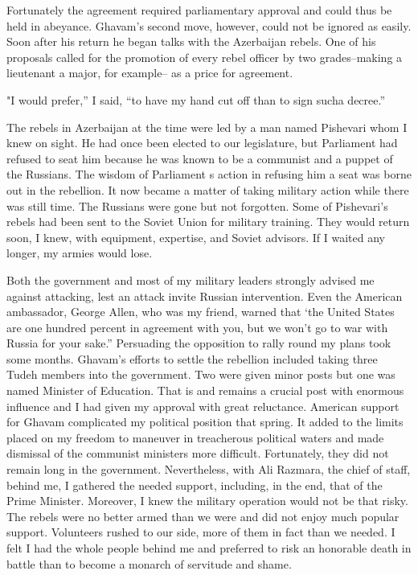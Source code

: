 Fortunately the agreement required parliamentary approval and could thus be held in abeyance. Ghavam's second move, however, could not be ignored as easily. Soon after his return he began talks with the Azerbaijan rebels. One of his proposals called for the promotion of every rebel officer by two grades--making a lieutenant a major, for example-- as a price for agreement. 

"I would prefer,” I said, “to have my hand cut off than to sign sucha 
decree.” 

The rebels in Azerbaijan at the time were led by a man named Pishevari whom I knew on sight. He had once been elected to our legislature, but Parliament had refused to seat him because he was known to be a communist and a puppet of the Russians. The wisdom of Parliament s action in refusing him a seat was borne out in the rebellion. It now became a matter of taking military action while there was still time. The Russians were gone but not forgotten. Some of Pishevari's rebels had been sent to the Soviet Union for military training. They would return soon, I knew, with equipment, expertise, and Soviet advisors. If I waited any longer, my armies would lose. 

Both the government and most of my military leaders strongly advised me against attacking, lest an attack invite Russian intervention. Even the American ambassador, George Allen, who was my friend, warned that ‘the United States are one hundred percent in agreement with you, but we won't go to war with Russia for your sake.” Persuading the opposition to rally round my plans took some months. Ghavam’s efforts to settle the rebellion included taking three Tudeh members into the government. Two were given minor posts but one was named Minister of Education. That is and remains a crucial post with enormous influence and I had given my approval with great reluctance. American support for Ghavam complicated my political position that spring. It added to the limits placed on my freedom to maneuver in treacherous political waters and made dismissal of the communist ministers more difficult. Fortunately, they did not remain long in the government. Nevertheless, with Ali Razmara, the chief of staff, behind me, I gathered the needed support, including, in the end, that of the Prime Minister. Moreover, I knew the military operation would not be that risky. The rebels were no better armed than we were and did not enjoy much popular support. Volunteers rushed to our side, more of them in fact than we needed. I felt I had the whole people behind me and preferred to risk an honorable death in battle than to become a monarch of servitude and shame. 

